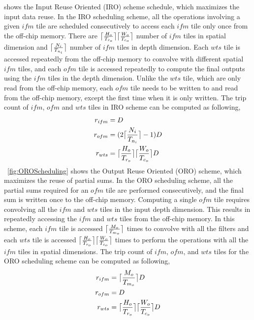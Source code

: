  shows the Input Reuse Oriented (IRO) scheme schedule, which maximizes the input data reuse. In the IRO scheduling scheme, all the operations involving a given $ifm$ tile are scheduled consecutively to access each $ifm$ tile only once from the off-chip memory. There are $\ceil[\big]{\frac{H_o}{T_{r_o}}}\ceil[\big]{\frac{W_o}{T_{c_o}}}$ number of $ifm$ tiles in spatial dimension and $\ceil[\big]{\frac{N_i}{T_{n_i}}}$ number of $ifm$ tiles in depth dimension. Each $wts$ tile is accessed repeatedly from the off-chip memory to convolve with different spatial $ifm$ tiles, and each $ofm$ tile is accessed repeatedly to compute the final outputs using the $ifm$ tiles in the depth dimension. Unlike the $wts$ tile, which are only read from the off-chip memory, each $ofm$ tile needs to be written to and read from the off-chip memory, except the first time when it is only written. The trip count of $ifm$, $ofm$ and $wts$ tiles in IRO scheme can be computed as following,
\begin{align}\label{eq:IROTripCount}
	\begin{split}
	r_{ifm} &= D \\
	r_{ofm}&= (2\ceil[\big]{\frac{N_i}{T_{n_i}}}-1)D \\
	r_{wts} &= \ceil[\big]{\frac{H_o}{T_{r_o}}}\ceil[\big]{\frac{W_o}{T_{c_o}}}D
	\end{split}
\end{align}
\figurename~\ref{fig:OROScheduling} shows the Output Reuse Oriented (ORO) scheme, which maximizes the reuse of partial sums. In the ORO scheduling scheme, all the partial sums required for an $ofm$ tile are performed consecutively, and the final sum is written once to the off-chip memory. Computing a single $ofm$ tile requires convolving all the $ifm$ and $wts$ tiles in the input depth dimension. This results in repeatedly accessing the $ifm$ and $wts$ tiles from the off-chip memory. In this scheme, each $ifm$ tile is accessed $\ceil[\big]{\frac{M_o}{T_{m_o}}}$ times to convolve with all the filters and each $wts$ tile is accessed $\ceil[\big]{\frac{H_o}{T_{r_o}}}\ceil[\big]{\frac{W_o}{T_{c_o}}}$ times to perform the operations with all the $ifm$ tiles in spatial dimensions. The trip count of $ifm$, $ofm$, and $wts$ tiles for the ORO scheduling scheme can be computed as following,
\begin{align}\label{eq:OROTripCount}
	\begin{split}
		r_{ifm} &= \ceil[\big]{\frac{M_o}{T_{m_o}}}D \\
		r_{ofm}&= D \\
		r_{wts} &= \ceil[\big]{\frac{H_o}{T_{r_o}}}\ceil[\big]{\frac{W_o}{T_{c_o}}} D
	\end{split}
\end{align}
